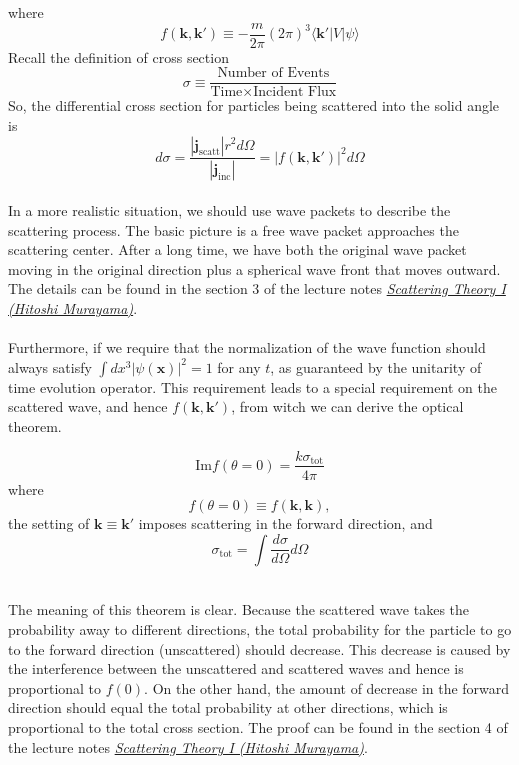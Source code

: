 where
\[f(\bm{k},\bm{k}') \equiv - \frac{m}{2\pi} (2\pi)^3  \langle \bm{k}'| V | \psi\rangle \]
Recall the definition of cross section
\[\sigma \equiv \frac{\mbox{Number of Events}}{\mbox{Time} \times \mbox{Incident Flux}}\]
So, the differential cross section for particles being scattered into the solid angle is
\[d\sigma = \frac{|\bm{j}_{\mathrm{scatt}}| r^2 d\Omega}{|\bm{j}_{\mathrm{inc}}|} = |f(\bm{k},\bm{k}')|^2 d\Omega\]
\\
In a more realistic situation, we should use wave packets to describe the scattering process. The basic picture is a free wave packet approaches the scattering center. After a long time, we have both the original wave packet moving in the original direction plus a spherical wave front that moves outward. The details can be found in the section 3 of the lecture notes 
\href{http://hitoshi.berkeley.edu/221B/index.html}{\emph{Scattering Theory I (Hitoshi Murayama)}}.
\\ \\
Furthermore, if we require that the normalization of the wave function should always satisfy $\int dx^3 |\psi(\bm{x})|^2 = 1$ for any $t$, as guaranteed by the unitarity of time evolution operator. This requirement leads to a special requirement on the scattered wave, and hence $f(\bm{k},\bm{k}')$, from witch we can derive the optical theorem.\\

\begin{newthem}
\[\mathrm{Im} f(\theta = 0) = \frac{k\sigma_{\mathrm{tot}}}{4\pi}\]
where
\[f(\theta = 0) \equiv f(\bm{k},\bm{k}),\]
the setting of $\bm{k} \equiv \bm{k}'$ imposes scattering in the forward direction, and
\[\sigma_{\mathrm{tot}} = \int \frac{d\sigma}{d\Omega} d\Omega\]
\end{newthem}
\noindent
\\
The meaning of this theorem is clear. Because the scattered wave takes the probability away to different directions, the total probability for the particle to go to the forward direction (unscattered) should decrease. This decrease is caused by the interference between the unscattered and scattered waves and hence is proportional to $f(0)$. On the other hand, the amount of decrease in the forward direction should equal the total probability at other directions, which is proportional to the total cross section. The proof can be found in the section 4 of the lecture notes \href{http://hitoshi.berkeley.edu/221B/index.html}{\emph{Scattering Theory I (Hitoshi Murayama)}}.


